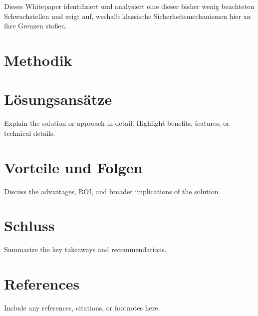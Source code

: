 \documentclass[14pt]{article}
\begin{document}
Dieses Whitepaper identifiziert und analysiert eine dieser bisher wenig beachteten Schwachstellen und zeigt auf, weshalb klassische Sicherheitsmechanismen hier an ihre Grenzen stoßen.

\section{Methodik}



\section{Lösungsansätze}
Explain the solution or approach in detail. Highlight benefits, features, or technical details.

\section{Vorteile und Folgen}
Discuss the advantages, ROI, and broader implications of the solution.

\section{Schluss}
Summarize the key takeaways and recommendations.

\newpage
\section*{References}
Include any references, citations, or footnotes here.
\end{document}
